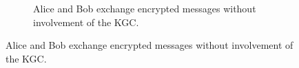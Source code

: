 \begin{figure}
\begin{subfigure}[t]{0.55\textwidth}
\begin{tikzpicture}[actor/.style={draw, minimum width=1.5cm}]
        \end{tikzpicture}
        \caption{Alice and Bob exchange encrypted messages without involvement of the KGC.}
    \end{subfigure}


\end{figure}
